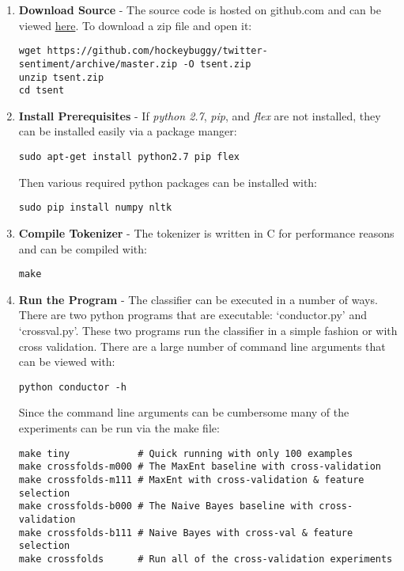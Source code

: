 \documentclass[final,3p,12pt]{elsarticle}
\begin{document}
\begin{enumerate}
    \item \textbf{Download Source} - The source code is hosted on github.com
        and can be viewed
        \href{https://github.com/hockeybuggy/semantic\_eval}{here}. To download a zip
        file and open it:

\begin{Verbatim}[fontsize=\footnotesize]
wget https://github.com/hockeybuggy/twitter-sentiment/archive/master.zip -O tsent.zip
unzip tsent.zip
cd tsent
\end{Verbatim}


    \item \textbf{Install Prerequisites} - If \textit{python 2.7},
        \textit{pip}, and \textit{flex} are not installed, they can be
        installed easily via a package manger:

\begin{Verbatim}[fontsize=\footnotesize]
sudo apt-get install python2.7 pip flex
\end{Verbatim}

Then various required python packages can be installed with:

\begin{Verbatim}[fontsize=\footnotesize]
sudo pip install numpy nltk
\end{Verbatim}

    \item \textbf{Compile Tokenizer} - The tokenizer is written in C for
        performance reasons and can be compiled with:
\begin{Verbatim}[fontsize=\footnotesize]
make
\end{Verbatim}

    \item \textbf{Run the Program} - The classifier can be executed in a number
        of ways. There are two python programs that are executable:
        `conductor.py' and `crossval.py'. These two programs run the classifier
        in a simple fashion or with cross validation. There are a large number
        of command line arguments that can be viewed with:

\begin{Verbatim}[fontsize=\footnotesize]
python conductor -h
\end{Verbatim}

Since the command line arguments can be cumbersome many of the experiments can
be run via the make file:

\begin{Verbatim}[fontsize=\footnotesize]
make tiny            # Quick running with only 100 examples
make crossfolds-m000 # The MaxEnt baseline with cross-validation
make crossfolds-m111 # MaxEnt with cross-validation & feature selection
make crossfolds-b000 # The Naive Bayes baseline with cross-validation
make crossfolds-b111 # Naive Bayes with cross-val & feature selection
make crossfolds      # Run all of the cross-validation experiments
\end{Verbatim}

\end{enumerate}
\end{document}
